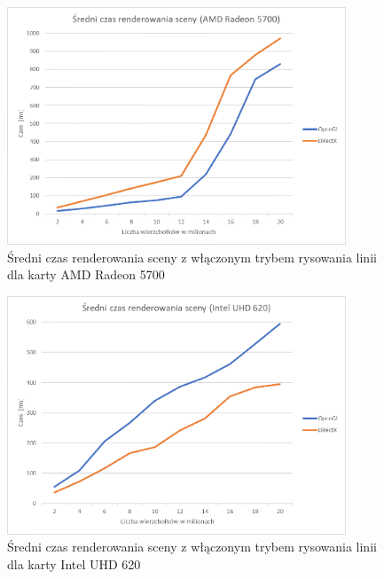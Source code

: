 \documentclass[archive]{mgr}
\begin{document}
\begin{figure}[h!]
  \centering
    \includegraphics[width=0.9\textwidth]{images/wire/2.png}
   \caption{Średni czas renderowania sceny z włączonym trybem rysowania linii dla karty AMD Radeon 5700}
   \label{lab:52}
\end{figure}
\bigbreak
\begin{figure}[h!]
  \centering
    \includegraphics[width=0.9\textwidth]{images/wire/3.png}
   \caption{Średni czas renderowania sceny z włączonym trybem rysowania linii dla karty Intel UHD 620}
   \label{lab:53}
\end{figure}
\newpage
\end{document}
